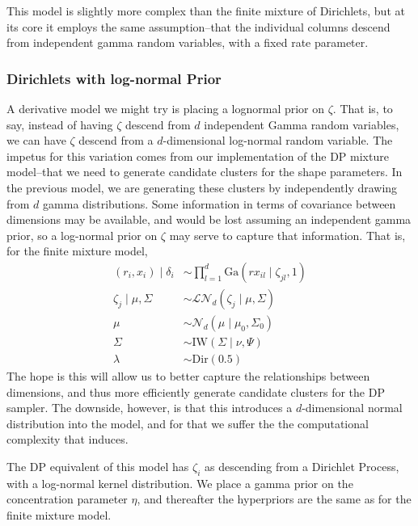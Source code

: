 This model is slightly more complex than the finite mixture of Dirichlets, but at its core it
  employs the same assumption--that the individual columns descend from independent gamma random
  variables, with a fixed rate parameter.

\subsubsection{Dirichlets with log-normal Prior}
A derivative model we might try is placing a lognormal prior on $\zeta$.  That is, to say, instead
  of having $\zeta$ descend from $d$ independent Gamma random variables, we can have $\zeta$
  descend from a $d$-dimensional log-normal random variable.  The impetus for this variation comes
  from our implementation of the DP mixture model--that we need to generate candidate clusters for
  the shape parameters.  In the previous model, we are generating these clusters by independently
  drawing from $d$ gamma distributions.  Some information in terms of covariance between dimensions
  may be available, and would be lost assuming an independent gamma prior, so a log-normal prior on
  $\zeta$ may serve to capture that information.  That is, for the finite mixture model,
  \begin{equation}
    \label{model:mgdln}
    \begin{aligned}
      (r_i, x_i) \mid \delta_i &\sim \prod_{l = 1}^d\text{Ga}(rx_{il}\mid \zeta_{jl}, 1)\\
        \zeta_{j} \mid \mu, \Sigma &\sim \mathcal{LN}_d\left(\zeta_j\mid\mu,\Sigma\right)\\
        \mu &\sim \mathcal{N}_d\left(\mu\mid\mu_0,\Sigma_0\right)\\
        \Sigma &\sim \text{IW}\left(\Sigma\mid\nu,\Psi\right) \\
        \lambda &\sim \text{Dir}(0.5)
    \end{aligned}
  \end{equation}
  The hope is this will allow us to better capture the relationships between dimensions, and thus
  more efficiently generate candidate clusters for the DP sampler.  The downside, however, is that
  this introduces a $d$-dimensional normal distribution into the model, and for that we suffer the
  the computational complexity that induces.

The DP equivalent of this model has $\zeta_i$ as descending from a Dirichlet Process, with a
  log-normal kernel distribution.  We place a gamma prior on the concentration parameter $\eta$,
  and thereafter the hyperpriors are the same as for the finite mixture model.

